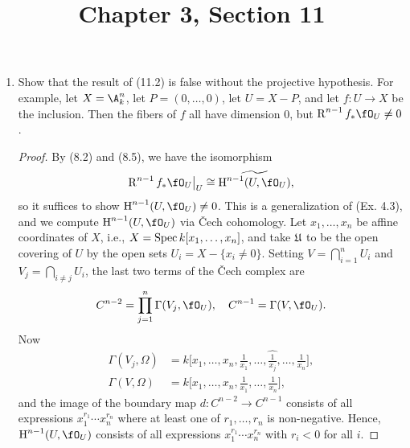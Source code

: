\documentclass[a4paper]{article}
\title{Chapter 3, Section 11}
\begin{document}
\maketitle

\begin{enumerate} [label=\textbf{\arabic*.}, leftmargin=0em]

    \item Show that the result of (11.2) is false without the projective hypothesis.
          For example, let $X = \A_k^n$, let $P = (0, \dots, 0)$, let $U = X - P$, and let $f: U \to X$ be the inclusion.
          Then the fibers of $f$ all have dimension $0$, but $\dR^{n - 1} f_* \fO_U \neq 0$.

          \begin{proof}
              By (8.2) and (8.5), we have the isomorphism
              \begin{equation*}
                  \restr{\dR^{n - 1} f_* \fO_U}{U} \cong \widetilde{\cH^{n - 1}(U, \fO_U)},
              \end{equation*}
              so it suffices to show $\cH^{n - 1}(U, \fO_U) \neq 0$.
              This is a generalization of (Ex. 4.3), and we compute $\cH^{n - 1}(U, \fO_U)$ via Čech cohomology.
              Let $x_1, \dots, x_n$ be affine coordinates of $X$, i.e., $X = \operatorname{Spec}{k[x_1, \dots, x_n]}$, and take $\mathfrak{U}$ to be the open covering of $U$ by the open sets $U_i = X - \{x_i \neq 0 \}$.
              Setting $V = \bigcap_{i = 1}^n U_i$ and $V_j = \bigcap_{i \neq j} U_i$, the last two terms of the Čech complex are
              \begin{equation*}
                  C^{n - 2} = \prod_{j = 1}^n \Gamma(V_j, \fO_U), \quad C^{n - 1} = \Gamma(V, \fO_U).
              \end{equation*}
              Now
              \begin{align*}
                  \Gamma(V_j, \Omega) & = k\bigg[x_1, \dots, x_n, \frac{1}{x_1}, \dots, \widehat{\frac{1}{x_j}}, \dots, \frac{1}{x_n} \bigg], \\
                  \Gamma(V, \Omega)   & = k\bigg[x_1, \dots, x_n, \frac{1}{x_1}, \dots, \frac{1}{x_n} \bigg],
              \end{align*}
              and the image of the boundary map $d : C^{n - 2} \to C^{n - 1}$ consists of all expressions $x_1^{r_1} \cdots x_n^{r_n}$ where at least one of $r_1, \dots, r_n$ is non-negative.
              Hence, $\cH^{n - 1}(U, \fO_U)$ consists of all expressions $x_1^{r_1} \cdots x_n^{r_n}$ with $r_i < 0$ for all $i$.
          \end{proof}


\end{enumerate}
\end{document}
